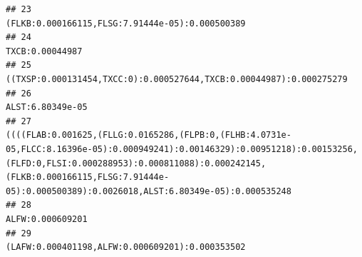\documentclass[]{article}
\begin{document}
\begin{verbatim}
## 23                                                                                                                                                                                                                                                                                                                                                                                            (FLKB:0.000166115,FLSG:7.91444e-05):0.000500389
## 24                                                                                                                                                                                                                                                                                                                                                                                                                            TXCB:0.00044987
## 25                                                                                                                                                                                                                                                                                                                                                                        ((TXSP:0.000131454,TXCC:0):0.000527644,TXCB:0.00044987):0.000275279
## 26                                                                                                                                                                                                                                                                                                                                                                                                                           ALST:6.80349e-05
## 27                                                                                                                                                                   ((((FLAB:0.001625,(FLLG:0.0165286,(FLPB:0,(FLHB:4.0731e-05,FLCC:8.16396e-05):0.000949241):0.00146329):0.00951218):0.00153256,(FLFD:0,FLSI:0.000288953):0.000811088):0.000242145,(FLKB:0.000166115,FLSG:7.91444e-05):0.000500389):0.0026018,ALST:6.80349e-05):0.000535248
## 28                                                                                                                                                                                                                                                                                                                                                                                                                           ALFW:0.000609201
## 29                                                                                                                                                                                                                                                                                                                                                                                            (LAFW:0.000401198,ALFW:0.000609201):0.000353502

\end{verbatim}
\end{document}
